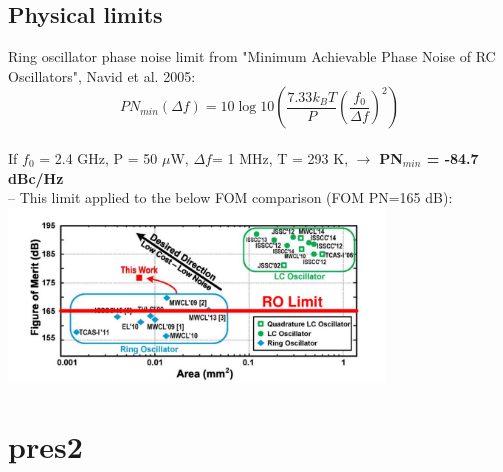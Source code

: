 \documentclass[10pt,a4paper]{article}
\begin{document}
		\flushleft
		\subsection{Physical limits}
		\scriptsize
		Ring oscillator phase noise limit from "Minimum Achievable Phase Noise of RC Oscillators", Navid et al. 2005:
		\begin{equation}
			PN_{min}(\Delta f)= 10\log 10\left(\frac{7.33k_BT}{P}\left(\frac{f_0}{\Delta f}\right)^2\right)
		\end{equation}
		\vspace{-.8em}\\
		If $f_0$ = 2.4 GHz, P = 50 $\mu$W, $\Delta f$= 1 MHz, T = 293 K, $\rightarrow$ \textbf{PN$_{min}$ = -84.7 dBc/Hz} \\
		-- This limit applied to the below FOM comparison (FOM PN=165 dB):
		\vspace{-1.5em}
		\center\includegraphics[width=0.75\textwidth, angle=0]{figs/ro_perf.pdf}



	\section{pres2}
		\flushleft
\end{document}
